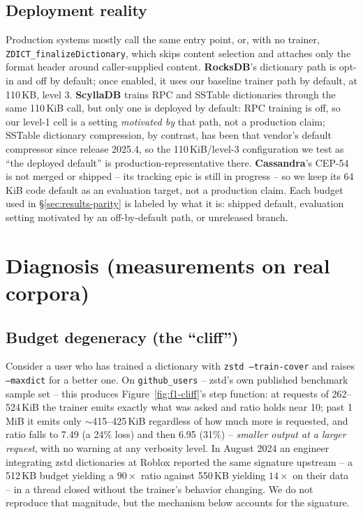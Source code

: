 \documentclass[12pt]{article}
\begin{document}
\subsection{Deployment reality}
\label{sec:background-deployment}
\begin{sloppypar}
Production systems mostly call the same entry point, or,
with no trainer, \texttt{ZDICT\_finalizeDictionary}, which skips
content selection and attaches only the format header around
caller-supplied content. \textbf{RocksDB}'s dictionary path is opt-in and off by
default; once enabled, it uses our baseline trainer path by default, at
110\,KB, level 3. \textbf{ScyllaDB} trains RPC and SSTable dictionaries
through the same 110\,KiB call, but only one is deployed by default:
RPC training is off, so our level-1 cell is a setting \emph{motivated
by} that path, not a production claim; SSTable dictionary compression,
by contrast, has been that vendor's default compressor since release
2025.4, so the 110\,KiB/level-3 configuration we test as ``the deployed
default'' is production-representative there. \textbf{Cassandra}'s
CEP-54 is not merged or shipped -- its tracking epic is still in
progress -- so we keep its 64\,KiB code default as an evaluation
target, not a production claim. Each budget used in
\S\ref{sec:results-parity} is labeled by what it is: shipped default,
evaluation setting motivated by an off-by-default path, or unreleased
branch.
\end{sloppypar}

\section{Diagnosis (measurements on real corpora)}
\label{sec:diagnosis}

\subsection{Budget degeneracy (the ``cliff'')}
\label{sec:diagnosis-cliff}

Consider a user who has trained a dictionary with \texttt{zstd
--train-cover} and raises \texttt{--maxdict} for a better one. On
\texttt{github\_users} -- zstd's own published benchmark sample set --
this produces Figure~\ref{fig:f1-cliff}'s step function: at requests of
262--524\,KiB the trainer emits exactly what was asked and ratio holds
near 10; past 1\,MiB it emits only $\sim$415--425\,KiB regardless of how
much more is requested, and ratio falls to 7.49 (a 24\% loss) and then
6.95 (31\%) -- \emph{smaller output at a larger request}, with no
warning at any verbosity level. In August 2024 an engineer integrating
zstd dictionaries at Roblox reported the same signature upstream -- a
512\,KB budget yielding a $90\times$ ratio against 550\,KB yielding
$14\times$ on their data~\cite{zstdissue4127} -- in a thread closed
without the trainer's behavior changing. We do not reproduce that
magnitude, but the mechanism below accounts for the signature.
\end{document}
